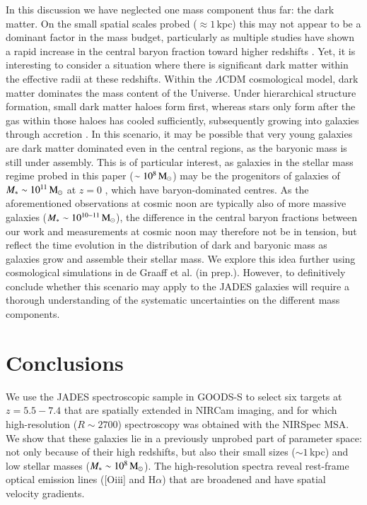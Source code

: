 \documentclass[longauth]{aa}
\newcommand{\Msun}{\rm M_\odot}
\begin{document}
In this discussion we have neglected one mass component thus far: the dark matter. On the small spatial scales probed ($\approx 1\,$kpc) this may not appear to be a dominant factor in the mass budget, particularly as multiple studies have shown a rapid increase in the central baryon fraction toward higher redshifts \citep[e.g.,][]{vDokkum2015,Price2016,Wuyts2016,Genzel2017,Genzel2020}. Yet, it is interesting to consider a situation where there is significant dark matter within the effective radii at these redshifts. Within the $\Lambda$CDM cosmological model, dark matter dominates the mass content of the Universe. Under hierarchical structure formation, small dark matter haloes form first, whereas stars only form after the gas within those haloes has cooled sufficiently, subsequently growing into galaxies through accretion \citep[cold gas streams, mergers; e.g.,][]{White1978,Dekel2009a,Oser2010}. In this scenario, it may be possible that very young galaxies are dark matter dominated even in the central regions, as the baryonic mass is still under assembly. {This is of particular interest, as galaxies in the stellar mass regime probed in this paper ($\sim10^8\,\Msun$) may be the progenitors of galaxies of $M_*\sim10^{11}\,\Msun$ at $z=0$ \citep{Moster2018,Behroozi2019}, which have baryon-dominated centres. As the aforementioned observations at cosmic noon are typically also of more massive galaxies ($M_*\sim10^{10-11}\,\Msun$), the difference in the central baryon fractions between our work and measurements at cosmic noon may therefore not be in tension, but reflect the time evolution in the distribution of dark and baryonic mass as galaxies grow and assemble their stellar mass. We explore this idea further using cosmological simulations in de Graaff et al. (in prep.). However, to definitively conclude whether this scenario may apply to the JADES galaxies will require a thorough understanding of the systematic uncertainties on the different mass components. }




\section{Conclusions}\label{sec:conclusion}

We use the JADES spectroscopic sample in GOODS-S to select six targets at $z=5.5-7.4$ that are spatially extended in NIRCam imaging, and for which high-resolution ($R\sim2700$) spectroscopy was obtained with the NIRSpec MSA. We show that these galaxies lie in a previously unprobed part of parameter space: not only because of their high redshifts, but also their small sizes ($\sim 1\,$kpc) and low stellar masses ($M_*\sim10^8\,\Msun$). %
The high-resolution spectra reveal rest-frame optical emission lines ([O{\sc iii}] and H$\alpha$) that are broadened and have spatial velocity gradients. 
\end{document}
